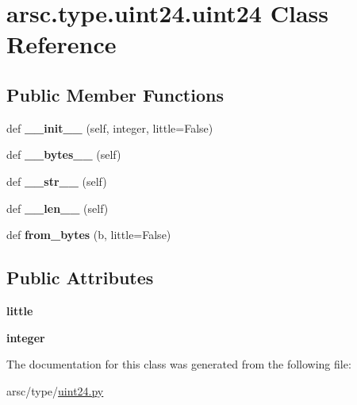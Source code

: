\hypertarget{classarsc_1_1type_1_1uint24_1_1uint24}{}\section{arsc.\+type.\+uint24.\+uint24 Class Reference}
\label{classarsc_1_1type_1_1uint24_1_1uint24}
\subsection*{Public Member Functions}
\begin{DoxyCompactItemize}
\item 
\mbox{\label{classarsc_1_1type_1_1uint24_1_1uint24_acd0f25877db74ff2c1dcc86d8afcb66e}} 
def {\bfseries \+\_\+\+\_\+init\+\_\+\+\_\+} (self, integer, little=False)
\item 
\mbox{\label{classarsc_1_1type_1_1uint24_1_1uint24_a06d36d934c22d6323836170a0658971f}} 
def {\bfseries \+\_\+\+\_\+bytes\+\_\+\+\_\+} (self)
\item 
\mbox{\label{classarsc_1_1type_1_1uint24_1_1uint24_a3b8896bf0b376a7eb223a8ffc32cdff6}} 
def {\bfseries \+\_\+\+\_\+str\+\_\+\+\_\+} (self)
\item 
\mbox{\label{classarsc_1_1type_1_1uint24_1_1uint24_a0124307784fa9107fc2ce65d1bcf0a28}} 
def {\bfseries \+\_\+\+\_\+len\+\_\+\+\_\+} (self)
\item 
\mbox{\label{classarsc_1_1type_1_1uint24_1_1uint24_ae2a6da17ffaf06d506b5cd0dd0d0c52d}} 
def {\bfseries from\+\_\+bytes} (b, little=False)
\end{DoxyCompactItemize}
\subsection*{Public Attributes}
\begin{DoxyCompactItemize}
\item 
\mbox{\label{classarsc_1_1type_1_1uint24_1_1uint24_a6e67e9412b144eb87a0fd54d9ef73c14}} 
{\bfseries little}
\item 
\mbox{\label{classarsc_1_1type_1_1uint24_1_1uint24_a138edc948c8ef2f718270cf749475374}} 
{\bfseries integer}
\end{DoxyCompactItemize}


The documentation for this class was generated from the following file\+:\begin{DoxyCompactItemize}
\item 
arsc/type/\mbox{\hyperlink{uint24_8py}{uint24.\+py}}\end{DoxyCompactItemize}
